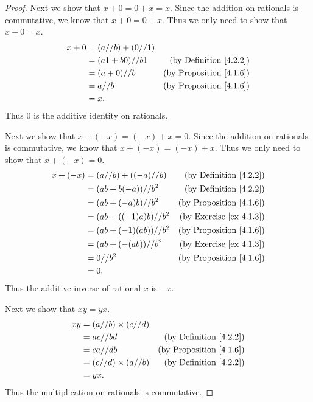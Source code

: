 \begin{proof}
    Next we show that \(x + 0 = 0 + x = x\).
    Since the addition on rationals is commutative, we know that \(x + 0 = 0 + x\).
    Thus we only need to show that \(x + 0 = x\).
    \begin{align*}
        x + 0 & = (a // b) + (0 // 1)                                       \\
              & = (a1 + b0) // b1     & \text{(by Definition \ref{4.2.2})}  \\
              & = (a + 0) // b        & \text{(by Proposition \ref{4.1.6})} \\
              & = a // b              & \text{(by Proposition \ref{4.1.6})} \\
              & = x.
    \end{align*}
    Thus \(0\) is the additive identity on rationals.

    Next we show that \(x + (-x) = (-x) + x = 0\).
    Since the addition on rationals is commutative, we know that \(x + (-x) = (-x) + x\).
    Thus we only need to show that \(x + (-x) = 0\).
    \begin{align*}
        x + (-x) & = (a // b) + ((-a) // b) & \text{(by Definition \ref{4.2.2})}  \\
                 & = (ab + b(-a)) // b^2    & \text{(by Definition \ref{4.2.2})}  \\
                 & = (ab + (-a)b) // b^2    & \text{(by Proposition \ref{4.1.6})} \\
                 & = (ab + ((-1)a)b) // b^2 & \text{(by Exercise \ref{ex 4.1.3})} \\
                 & = (ab + (-1)(ab)) // b^2 & \text{(by Proposition \ref{4.1.6})} \\
                 & = (ab + (-(ab)) // b^2   & \text{(by Exercise \ref{ex 4.1.3})} \\
                 & = 0 // b^2               & \text{(by Proposition \ref{4.1.6})} \\
                 & = 0.
    \end{align*}
    Thus the additive inverse of rational \(x\) is \(-x\).

    Next we show that \(xy = yx\).
    \begin{align*}
        xy & = (a // b) \times (c // d)                                       \\
           & = ac // bd                 & \text{(by Definition \ref{4.2.2})}  \\
           & = ca // db                 & \text{(by Proposition \ref{4.1.6})} \\
           & = (c // d) \times (a // b) & \text{(by Definition \ref{4.2.2})}  \\
           & = yx.
    \end{align*}
    Thus the multiplication on rationals is commutative.


\end{proof}
